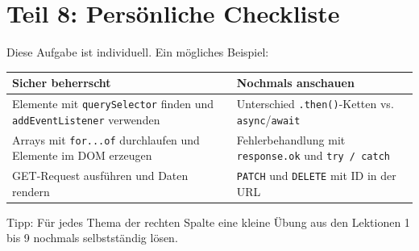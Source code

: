 \documentclass[a4paper,12pt]{article}
\begin{document}
\section{Teil 8: Persönliche Checkliste}

Diese Aufgabe ist individuell. Ein mögliches Beispiel:

\begin{center}
\begin{tabularx}{\textwidth}{@{}>{\raggedright\arraybackslash}X>{\raggedright\arraybackslash}X@{}}
\toprule
\textbf{Sicher beherrscht} & \textbf{Nochmals anschauen} \\
\midrule
Elemente mit \texttt{querySelector} finden und \texttt{addEventListener} verwenden & Unterschied \texttt{.then()}-Ketten vs. \texttt{async}/\texttt{await} \\
\addlinespace
Arrays mit \texttt{for...of} durchlaufen und Elemente im DOM erzeugen & Fehlerbehandlung mit \texttt{response.ok} und \texttt{try / catch} \\
\addlinespace
GET-Request ausführen und Daten rendern & \texttt{PATCH} und \texttt{DELETE} mit ID in der URL \\
\bottomrule
\end{tabularx}
\end{center}

Tipp: Für jedes Thema der rechten Spalte eine kleine Übung aus den Lektionen 1 bis 9 nochmals selbstständig lösen.
\end{document}
